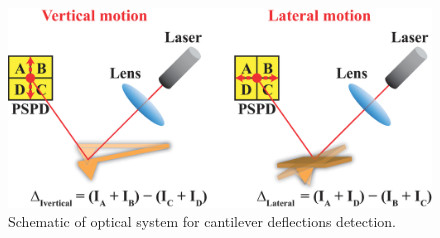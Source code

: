 \begin{figure}[htb]
\centering
\includegraphics[scale=0.4]{figures/afm2.eps}
\caption{\label{fig:afm2}Schematic of optical system for cantilever deflections detection.}
\end{figure}

